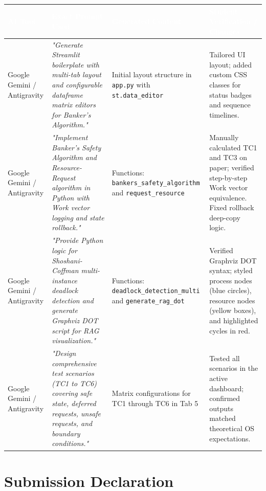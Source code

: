 \documentclass[11pt,a4paper]{article}
\begin{document}
\begin{table}[h!]
\centering
\small
\renewcommand{\arraystretch}{1.3}
\begin{tabularx}{\textwidth}{|L{3.2cm}|L{4.2cm}|L{3.6cm}|X|}
\hline
{}
\textcolor{white}{\textbf{AI Tool}} & \textcolor{white}{\textbf{Exact Prompt Used}} & \textcolor{white}{\textbf{Generated Content}} & \textcolor{white}{\textbf{Student Verification / Changes}} \\
\hline
Google Gemini / Antigravity & \textit{"Generate Streamlit boilerplate with multi-tab layout and configurable dataframe matrix editors for Banker's Algorithm."} & Initial layout structure in \texttt{app.py} with \texttt{st.data\_editor} & Tailored UI layout; added custom CSS classes for status badges and sequence timelines. \\
\hline
Google Gemini / Antigravity & \textit{"Implement Banker's Safety Algorithm and Resource-Request algorithm in Python with Work vector logging and state rollback."} & Functions: \texttt{bankers\_safety\_algorithm} and \texttt{request\_resource} & Manually calculated TC1 and TC3 on paper; verified step-by-step Work vector equivalence. Fixed rollback deep-copy logic. \\
\hline
Google Gemini / Antigravity & \textit{"Provide Python logic for Shoshani-Coffman multi-instance deadlock detection and generate Graphviz DOT script for RAG visualization."} & Functions: \texttt{deadlock\_detection\_multi} and \texttt{generate\_rag\_dot} & Verified Graphviz DOT syntax; styled process nodes (blue circles), resource nodes (yellow boxes), and highlighted cycles in red. \\
\hline
Google Gemini / Antigravity & \textit{"Design comprehensive test scenarios (TC1 to TC6) covering safe state, deferred requests, unsafe requests, and boundary conditions."} & Matrix configurations for TC1 through TC6 in Tab 5 & Tested all scenarios in the active dashboard; confirmed outputs matched theoretical OS expectations. \\
\hline
\end{tabularx}
\end{table}

\section{Submission Declaration}
\end{document}
